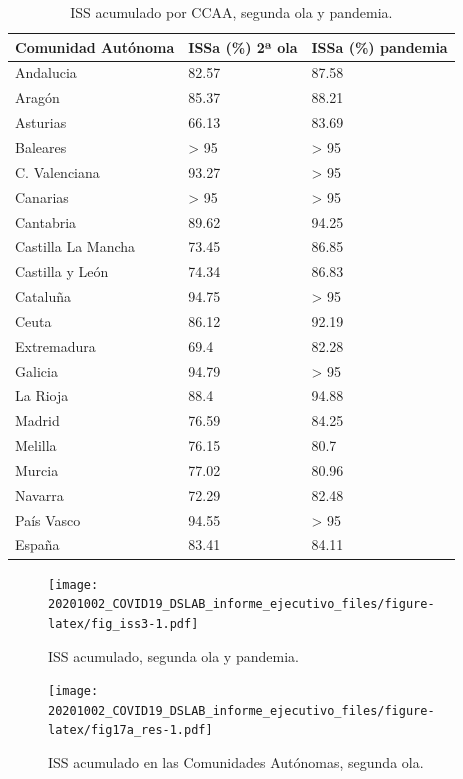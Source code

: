 \documentclass[
  11pt,
]{article}
\begin{document}
\begin{table}[!h]

\caption{\label{tab:tabla}ISS acumulado por CCAA, segunda ola y pandemia.}
\centering
\fontsize{9}{11}\selectfont
\begin{tabular}[t]{l|l|l}
\hline
Comunidad Autónoma & ISSa (\%) 2ª ola & ISSa (\%) pandemia\\
\hline
Andalucia & 82.57 & 87.58\\
\hline
Aragón & 85.37 & 88.21\\
\hline
Asturias & 66.13 & 83.69\\
\hline
Baleares & > 95 & > 95\\
\hline
C. Valenciana & 93.27 & > 95\\
\hline
Canarias & > 95 & > 95\\
\hline
Cantabria & 89.62 & 94.25\\
\hline
Castilla La Mancha & 73.45 & 86.85\\
\hline
Castilla y León & 74.34 & 86.83\\
\hline
Cataluña & 94.75 & > 95\\
\hline
Ceuta & 86.12 & 92.19\\
\hline
Extremadura & 69.4 & 82.28\\
\hline
Galicia & 94.79 & > 95\\
\hline
La Rioja & 88.4 & 94.88\\
\hline
Madrid & 76.59 & 84.25\\
\hline
Melilla & 76.15 & 80.7\\
\hline
Murcia & 77.02 & 80.96\\
\hline
Navarra & 72.29 & 82.48\\
\hline
País Vasco & 94.55 & > 95\\
\hline
España & 83.41 & 84.11\\
\hline
\end{tabular}
\end{table}

\begin{figure}
\centering
\texttt{[image: 20201002\_COVID19\_DSLAB\_informe\_ejecutivo\_files/figure-latex/fig\_iss3-1.pdf]}
\caption{\label{fig:fig_iss3} ISS acumulado, segunda ola y pandemia.}
\end{figure}

\vspace{0.2cm}

\begin{figure}
\centering
\texttt{[image: 20201002\_COVID19\_DSLAB\_informe\_ejecutivo\_files/figure-latex/fig17a\_res-1.pdf]}
\caption{\label{fig:fig17a_res} ISS acumulado en las Comunidades
Autónomas, segunda ola.}
\end{figure}
\end{document}
